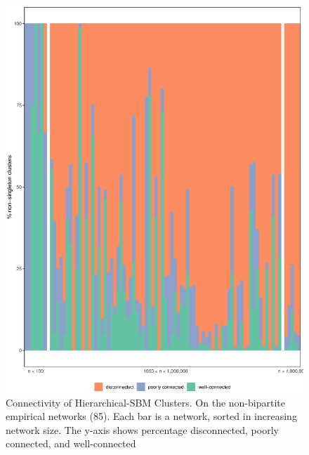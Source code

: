 \documentclass[aps,pre,superscriptaddress]{article}
\begin{document}
\begin{figure}[ht]
	\centering
	\begin{subfloat}
		\centering
		\includegraphics[width=\textwidth]{nested_sbm_conn.eps}
	\end{subfloat}
	\caption{
		Connectivity of Hierarchical-SBM Clusters.
		On the non-bipartite empirical networks (85).
		Each bar is a network, sorted in increasing network size.
		The y-axis shows percentage disconnected, poorly connected, and well-connected
	}
	\label{figs:nested_sbm_conn}
\end{figure}
\end{document}
